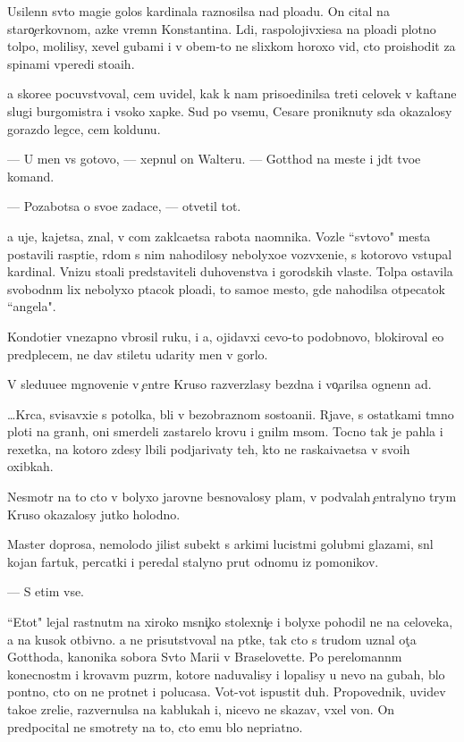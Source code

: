 \documentclass[10pt]{book}
\begin{document}
Usilenn{\yi}{\y} sv{\ia}to{\y} magi{\y}e{\y} golos kardinala raznosilsa nad plo{\x}ad{\y}u. On cital na staro{\c}erkovnom, {\y}az{\yi}ke vrem{\e}n Konstantina. L{\iu}di, raspolojivxi{\y}esa na plo{\x}adi plotno{\y} tolpo{\y}, molilisy, xevel{\ia} gubami i v ob{\x}em-to ne slixkom horoxo vid{\ia}, cto proishodit za spinami vperedi sto{\y}a{\x}ih.

{\Y}a skore{\y}e pocuvstvoval, cem uvidel, kak k nam priso{\y}edinilsa treti{\y} celovek v kaftane slugi burgomistra i v{\yi}soko{\y} xapke. Sud{\ia} po vsemu, Cesare proniknuty s{\iu}da okazalosy gorazdo legce, cem koldunu.

— U men{\ia} vs{\e} gotovo, — xepnul on Walteru. — Gotthod na meste i jd{\e}t tvo{\y}e{\y} komand{\yi}.

— Pozabotsa o svo{\y}e{\y} zadace, — otvetil tot.

{\Y}a uje, kajetsa, znal, v com zakl{\iu}ca{\y}etsa rabota na{\y}omnika. Vozle ``sv{\ia}tovo" mesta postavili rasp{\ia}ti{\y}e, r{\ia}dom s nim nahodilosy nebolyxo{\y}e vozv{\yi}xeni{\y}e, s kotorovo v{\yi}stupal kardinal. Vnizu sto{\y}ali predstaviteli duhovenstva i gorodskih vlaste{\y}. Tolpa ostavila svobodn{\yi}m lix nebolyxo{\y} p{\ia}tacok plo{\x}adi, to samo{\y}e mesto, gde nahodilsa otpecatok ``angela".

Kondotier vnezapno v{\yi}brosil ruku, i {\y}a, ojidavxi{\y} cevo-to podobnovo, blokiroval {\y}e{\y}o predplec{\y}em, ne dav stiletu udarity men{\ia} v gorlo.

V sledu{\y}u{\x}e{\y}e mgnoveni{\y}e v {\c}entre Kruso razverzlasy bezdna i vo{\c}arilsa ognenn{\yi}{\y} ad.



…Kr{\iu}c{\y}a, svisavxi{\y}e s potolka, b{\yi}li v bezobraznom sosto{\y}ani{\y}i. Rjav{\yi}{\y}e, s ostatkami t{\e}mno{\y} ploti na gran{\ia}h, oni smerdeli zastarelo{\y} krov{\y}u i gnil{\yi}m m{\ia}som. Tocno tak je pahla i rexetka, na kotoro{\y} zdesy l{\iu}bili podjarivaty teh, kto ne raska{\y}iva{\y}etsa v svo{\y}ih oxibkah.

Nesmotr{\ia} na to cto v bolyxo{\y} jarovne besnovalosy plam{\ia}, v podvalah {\c}entralyno{\y} t{\iu}rym{\yi} Kruso okazalosy jutko holodno.

Master doprosa, nemolodo{\y} jilist{\yi}{\y} sub{\y}ekt s {\y}arkimi lucist{\yi}mi golub{\yi}mi glazami, sn{\ia}l kojan{\yi}{\y} fartuk, percatki i peredal stalyno{\y} prut odnomu iz pomo{\x}nikov.

— S etim vse.

``Etot" lejal rast{\ia}nut{\yi}m na xiroko{\y} m{\ia}sni{\c}ko{\y} stolexni{\c}e i bolyxe pohodil ne na celoveka, a na kusok otbivno{\y}. {\Y}a ne prisutstvoval na p{\yi}tke, tak cto s trudom uznal ot{\c}a Gotthoda, kanonika sobora Sv{\ia}to{\y} Mari{\y}i v Braselovette. Po perelomann{\yi}m konecnost{\ia}m i krovav{\yi}m puz{\yi}r{\ia}m, kotor{\yi}{\y}e naduvalisy i lopalisy u nevo na gubah, b{\yi}lo pon{\ia}tno, cto on ne prot{\ia}net i polucasa. Vot-vot ispustit duh. Propovednik, uvidev tako{\y}e zreli{\x}e, razvernulsa na kablukah i, nicevo ne skazav, v{\yi}xel von. On predpocital ne smotrety na to, cto {\y}emu b{\yi}lo nepri{\y}atno.
\end{document}
